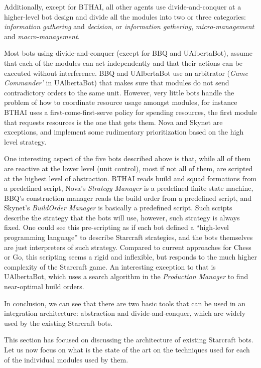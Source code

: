\documentclass[journal]{IEEEtran}
\begin{document}
Additionally, except for BTHAI, all other agents use divide-and-conquer at a higher-level bot design and divide all the modules into two or three categories: {\em information gathering} and {\em decision}, or {\em information gathering}, {\em micro-management} and {\em macro-management}.

Most bots using divide-and-conquer (except for BBQ and UAlbertaBot), assume that each of the modules can act independently and that their actions can be executed without interference. BBQ and UAlbertaBot use an arbitrator ({\em Game Commander'} in UAlbertaBot) that makes sure that modules do not send contradictory orders to the same unit. However, very little bots handle the problem of how to coordinate resource usage amongst modules, for instance BTHAI uses a first-come-first-serve policy for spending resources, the first module that requests resources is the one that gets them. Nova and Skynet are exceptions, and implement some rudimentary prioritization based on the high level strategy.

One interesting aspect of the five bots described above is that, while all of them are reactive at the lower level (unit control), most if not all of them, are scripted at the highest level of abstraction. BTHAI reads build and squad formations from a predefined script, Nova's {\em Strategy Manager} is a predefined finite-state machine, BBQ's construction manager reads the build order from a predefined script, and Skynet's {\em BuildOrder Manager} is basically a predefined script. Such scripts describe the strategy that the bots will use, however, such strategy is always fixed. One could see this pre-scripting as if each bot defined a ``high-level programming language'' to describe Starcraft strategies, and the bots themselves are just interpreters of such strategy. Compared to current approaches for Chess or Go, this scripting seems a rigid and inflexible, but responds to the much higher complexity of the Starcraft game. An interesting exception to that is UAlbertaBot, which uses a search algorithm in the {\em Production Manager} to find near-optimal build orders. 

In conclusion, we can see that there are two basic tools that can be used in an integration architecture: abstraction and divide-and-conquer, which are widely used by the existing Starcraft bots. 

This section has focused on discussing the architecture of existing Starcraft bots. Let us now focus on what is the state of the art on the techniques used for each of the individual modules used by them.
\end{document}
